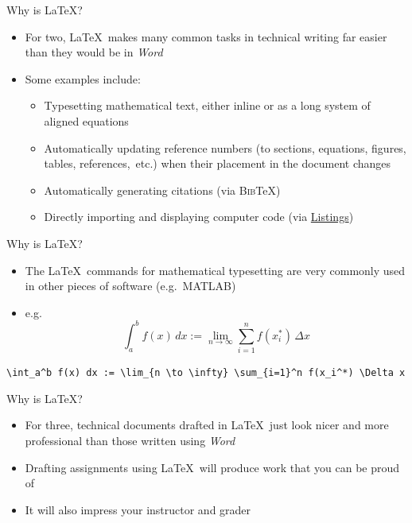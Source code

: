 \documentclass{beamer} %
\begin{document}
\begin{frame}{Why is \LaTeX?}

\begin{itemize}
	\item For two, \LaTeX\ makes many common tasks in technical writing far easier than they would be in \textit{Word}
	\item Some examples include:
	\begin{itemize}
		\item Typesetting mathematical text, either inline or as a long system of aligned equations
		\item Automatically updating reference numbers (to sections, equations, figures, tables, references,~etc.) when their placement in the document changes
		\item Automatically generating citations (via \textsc{Bib}\TeX)
		\item Directly importing and displaying computer code (via \href{https://ctan.org/pkg/listings}{Listings})
	\end{itemize}
\end{itemize}

\end{frame}

\begin{frame}{Why is \LaTeX?}

\begin{itemize}
	\item The \LaTeX\ commands for mathematical typesetting are very commonly used in other pieces of software (e.g.~MATLAB)
	\item e.g. $$\int_a^b f(x) \, dx := \lim_{n \to \infty} \sum_{i=1}^n f(x_i^*) \, \Delta x$$
\end{itemize}

\scriptsize

\texttt{\textbackslash int\_a\^{}b f(x) dx := \textbackslash lim\_\{n \textbackslash to \textbackslash infty\} \textbackslash sum\_\{i=1\}\^{}n f(x\_i\^{}*) \textbackslash Delta x}

\end{frame}

\begin{frame}{Why is \LaTeX?}

\begin{itemize}
	\item For three, technical documents drafted in \LaTeX\ just look nicer and more professional than those written using \textit{Word}
	\item Drafting assignments using \LaTeX\ will produce work that you can be proud of
	\item It will also impress your instructor and grader
\end{itemize}

\end{frame}
\end{document}
